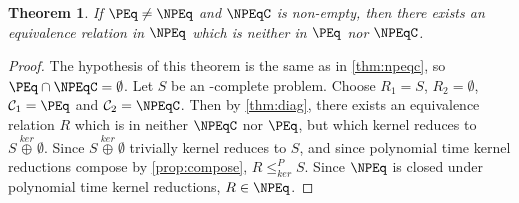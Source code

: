 \documentclass{article}
\newtheorem{theorem}{Theorem}[section]
\theoremstyle{definition} \newtheorem{definition}[definition]{Definition}
\newcommand{\kj}{\overset{ker}{\oplus}} %
\newcommand{\kr}{\leq^{P}_{ker}} %
\newcommand{\printintermediarytheorem}{If $\PEq\neq\NPEq$ and $\NPEqC$ is non-empty, then there exists an equivalence relation in $\NPEq$ which is neither in $\PEq$ nor $\NPEqC$.}
\begin{document}
\begin{theorem}\label{thm:intermediary}
  \printintermediarytheorem
\end{theorem}
\begin{proof}
  The hypothesis of this theorem is the same as in \autoref{thm:npeqc}, so $\PEq\cap\NPEqC=\emptyset$.
  Let $S$ be an \NPEq-complete problem.
  Choose $R_1=S$, $R_2=\emptyset$, $\mathcal{C}_1=\PEq$ and $\mathcal{C}_2=\NPEqC$.
  Then by \autoref{thm:diag}, there exists an equivalence relation $R$ which is in neither $\NPEqC$ nor $\PEq$, but which kernel reduces to $S\kj\emptyset$.
  Since $S\kj\emptyset$ trivially kernel reduces to $S$, and since polynomial time kernel reductions compose by \autoref{prop:compose}, $R\kr S$.
  Since $\NPEq$ is closed under polynomial time kernel reductions, $R\in\NPEq$.
\end{proof}

 
\end{document}
